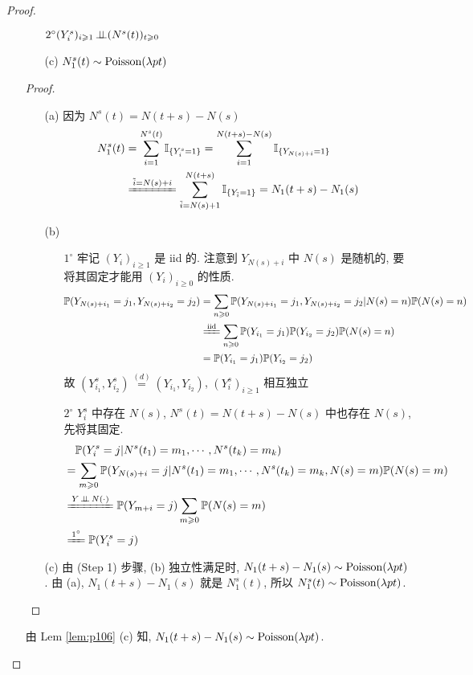 \begin{proof}
\begin{enumerate}
\begin{lemma}
\begin{enumerate}
            $2^{\circ} (Y_i^s)_{i\geqslant 1}\operatorname{\perp\!\!\!\perp} (N^s(t))_{t\geqslant 0}$
            \item[(c)] $N_1^s(t)\sim \operatorname{Poisson}(\lambda pt)$
        \end{enumerate}
    \end{lemma}
    \begin{proof}
        \begin{enumerate}
        \item[(a)] 因为 $N^s(t)=N(t+s)-N(s)$
        \[
        \begin{aligned}
N_1^s(t)&=\sum_{i=1}^{N^s(t)}\II_{\{Y_i^s=1\}}=\sum_{i=1}^{N(t+s)-N(s)}\II_{\{Y_{N(s)+i}=1\}}\\
&\xlongequal{\tilde{i}=N(s)+i}\sum_{\tilde{i}=N(s)+1}^{N(t+s)}\II_{\{Y_{\tilde{i}}=1\}}=N_1(t+s)-N_1(s)
\end{aligned}
        \]
        \item[(b)] 
        		 \begin{enumerate}
            \item[$1^{\circ}$] 牢记 $(Y_i)_{i\geq 1}$ 是 iid 的. 注意到 $Y_{N(s)+i}$ 中 $N(s)$ 是随机的, 要将其固定才能用 $(Y_i)_{i\geq 0}$ 的性质.
            \[
            \begin{aligned}
                \PP(Y_{N(s)+i_1}=j_1, Y_{N(s)+i_2}=j_2)&= \sum_{n\geq 0}\PP(Y_{N(s)+i_1}=j_1,Y_{N(s)+i_2}=j_2|N(s)=n)\PP(N(s)=n)\\
                &\xlongequal{\text{iid}}\sum_{n\geq 0}\PP(Y_{i_1}=j_1)\PP(Y_{i_2}=j_2)\PP(N(s)=n)\\
                &=\PP(Y_{i_1}=j_1)\PP(Y_{i_2}=j_2)
            \end{aligned}
            \]
            故 $(Y_{i_1}^s,Y_{i_2}^s)\overset{(d)}{=}(Y_{i_1},Y_{i_2})$, $(Y_i^s)_{i\geq 1}$ 相互独立
            \item[$2^{\circ}$] $Y^s_i$ 中存在 $N(s)$, $N^s(t)=N(t+s)-N(s)$ 中也存在 $N(s)$, 先将其固定. 
            \[
            \begin{aligned}
     &\quad\PP(Y_i^s=j|N^s(t_1)=m_1,\cdots,N^s(t_k)=m_k)\\     
&=\sum_{m\geq 0}\PP(Y_{N(s)+i}=j|N^s(t_1)=m_1,\cdots,N^s(t_k)=m_k,N(s)=m)\PP(N(s)=m)\\
&\xlongequal{Y\ind N(\cdot)}\PP(Y_{m+i}=j)\sum_{m\geq 0}\PP(N(s)=m)\\
&\xlongequal{1^{\circ}}\PP(Y_i^s=j)
\end{aligned}
            \]
            \end{enumerate}
				\item[(c)] 由 (Step 1) 步骤, (b) 独立性满足时, $N_1(t+s)-N_1(s)\sim \operatorname{Poisson}(\lambda pt)$. 由 (a), $N_1(t+s)-N_1(s)$ 就是 $N_1^s(t)$, 所以 $N_1^s(t)\sim \operatorname{Poisson}(\lambda pt)$.
        \end{enumerate}
    \end{proof}
    由 Lem \ref{lem:p106} (c) 知, $N_1(t+s)-N_1(s)\sim \operatorname{Poisson}(\lambda pt)$. 
    

\end{enumerate}
\end{proof}
